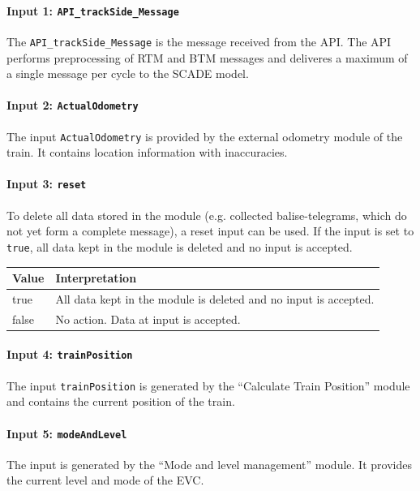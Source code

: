 \paragraph{Input 1: \texttt{API\_trackSide\_Message}}

The \texttt{API\_trackSide\_Message} is the message received from the API. The API performs preprocessing of RTM and BTM messages and deliveres a maximum of a single message per cycle to the SCADE model.

\paragraph{Input 2: \texttt{ActualOdometry}}
The input \texttt{ActualOdometry} is provided by the external odometry module of the train. It contains location information with inaccuracies.

\paragraph{Input 3: \texttt{reset}\\}
To delete all data stored in the module (e.g. collected balise-telegrams, which do not yet form a complete message), a reset input can be used. If the input is set to \texttt{true}, all data kept in the module is deleted and no input is accepted.

\begin{minipage}{\linewidth}
   \begin{tabular}{| l | p{9cm} |}
    \hline
    \textbf{Value} & \textbf{Interpretation}\\ \hline
    true & All data kept in the module is deleted and no input is accepted.\\
    false & No action. Data at input is accepted.\\
    \hline
  \end{tabular} 
  \label{tbl:reset}
\end{minipage}


\paragraph{Input 4: \texttt{trainPosition}}
The input \texttt{trainPosition} is generated by the ``Calculate Train Position'' module and contains the current position of the train.

\paragraph{Input 5: \texttt{modeAndLevel}}
The input is generated by the ``Mode and level management'' module. It provides the current level and mode of the EVC.

